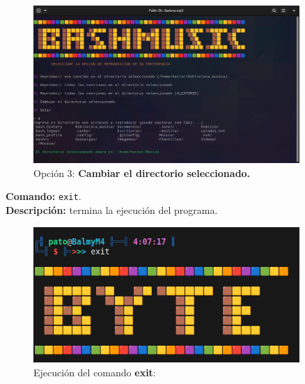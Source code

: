 \documentclass[titlepage]{article}
\begin{document}
\begin{figure}[H]
    \centering
    \includegraphics[width=0.9\textwidth]{bashmusic_4.png}
    \caption{Opción 3:  \textbf{Cambiar el directorio seleccionado.}}
    \label{fig:ejemplo4}
\end{figure}

\noindent
\textbf{Comando:} \verb|exit|. \\
\textbf{Descripción:} termina la ejecución del programa.           

\begin{figure}[H]
    \centering
    \includegraphics[width=0.9\textwidth]{exit.png}
    \caption{Ejecución del comando \textbf{exit}:}
    \label{fig:ejemplo}
\end{figure}
 

\newpage
\end{document}
